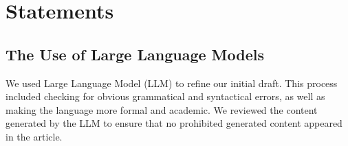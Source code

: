 \section{Statements}
\subsection{The Use of Large Language Models}
We used Large Language Model (LLM) to refine our initial draft. This process included checking for obvious grammatical and syntactical errors, as well as making the language more formal and academic. We reviewed the content generated by the LLM to ensure that no prohibited generated content appeared in the article.